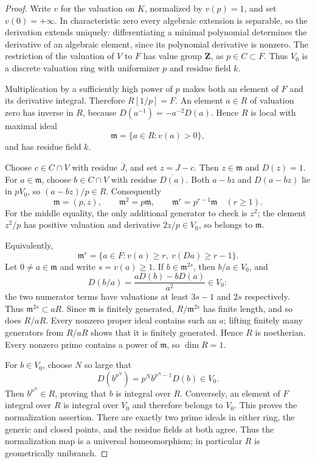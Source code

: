 \documentclass[11pt]{article}
\theoremstyle{remark}\newtheorem{remark}[theorem]{Remark}
\begin{document}
\begin{proof}
Write $v$ for the valuation on $K$, normalized by $v(p)=1$, and set $v(0)=+\infty$. In characteristic zero every algebraic extension is separable, so the derivation extends uniquely: differentiating a minimal polynomial determines the derivative of an algebraic element, since its polynomial derivative is nonzero. The restriction of the valuation of $V$ to $F$ has value group $\mathbf Z$, as $p\in C\subset F$. Thus $V_0$ is a discrete valuation ring with uniformizer $p$ and residue field $k$.

Multiplication by a sufficiently high power of $p$ makes both an element of $F$ and its derivative integral. Therefore $R[1/p]=F$. An element $a\in R$ of valuation zero has inverse in $R$, because $D(a^{-1})=-a^{-2}D(a)$. Hence $R$ is local with maximal ideal
\[
 \mathfrak m=\{a\in R:v(a)>0\},
\]
and has residue field $k$.

Choose $c\in C\cap V$ with residue $\bar J$, and set $z=J-c$. Then $z\in\mathfrak m$ and $D(z)=1$. For $a\in\mathfrak m$, choose $b\in C\cap V$ with residue $\overline{D(a)}$. Both $a-bz$ and $D(a-bz)$ lie in $pV_0$, so $(a-bz)/p\in R$. Consequently
\begin{equation}\label{eq:mpowers}
 \mathfrak m=(p,z),\qquad
 \mathfrak m^2=p\mathfrak m,\qquad
 \mathfrak m^r=p^{r-1}\mathfrak m\quad(r\geq1).
\end{equation}
For the middle equality, the only additional generator to check is $z^2$; the element $z^2/p$ has positive valuation and derivative $2z/p\in V_0$, so belongs to $\mathfrak m$.

Equivalently,
\[
 \mathfrak m^r=\{a\in F:v(a)\geq r,\ v(Da)\geq r-1\}.
\]
Let $0\ne a\in\mathfrak m$ and write $s=v(a)\geq1$. If $b\in\mathfrak m^{2s}$, then $b/a\in V_0$, and
\[
 D(b/a)=\frac{aD(b)-bD(a)}{a^2}\in V_0:
\]
the two numerator terms have valuations at least $3s-1$ and $2s$ respectively. Thus $\mathfrak m^{2s}\subset aR$. Since $\mathfrak m$ is finitely generated, $R/\mathfrak m^{2s}$ has finite length, and so does $R/aR$. Every nonzero proper ideal contains such an $a$; lifting finitely many generators from $R/aR$ shows that it is finitely generated. Hence $R$ is noetherian. Every nonzero prime contains a power of $\mathfrak m$, so $\dim R=1$.

For $b\in V_0$, choose $N$ so large that
\[
 D(b^{p^N})=p^N b^{p^N-1}D(b)\in V_0.
\]
Then $b^{p^N}\in R$, proving that $b$ is integral over $R$. Conversely, an element of $F$ integral over $R$ is integral over $V_0$ and therefore belongs to $V_0$. This proves the normalization assertion. There are exactly two prime ideals in either ring, the generic and closed points, and the residue fields at both agree. Thus the normalization map is a universal homeomorphism; in particular $R$ is geometrically unibranch.


\end{proof}
\end{document}
